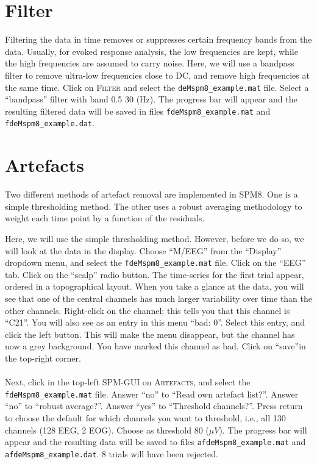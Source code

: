 \section{Filter}
Filtering the data in time removes or suppresses certain frequency bands from the data. Usually, for evoked response analysis, the low frequencies are kept, while the high frequencies are assumed to carry noise. Here, we will use a bandpass filter to remove ultra-low frequencies close to DC, and remove high frequencies at the same time. Click on \textsc{Filter} and select the \texttt{deMspm8\_example.mat} file. Select a ``bandpass'' filter with band 0.5 30 (Hz). The progress bar will appear and the resulting filtered data will be saved in files \texttt{fdeMspm8\_example.mat} and \texttt{fdeMspm8\_example.dat}.

\section{Artefacts}
Two different methods of artefact removal are implemented in SPM8. One is a simple thresholding method. The other uses a robust averaging methodology to weight each time point by a function of the residuals.

Here, we will use the simple thresholding method. However, before we do so, we will look at the data in the display. Choose ``M/EEG'' from the ``Display'' dropdown menu, and select the \texttt{fdeMspm8\_example.mat} file. Click on the ``EEG'' tab. Click on the ``scalp'' radio button. The time-series for the first trial appear, ordered in a topographical layout. When you take a glance at the data, you will see that one of the central channels has much larger variability over time than the other channels. Right-click on the channel; this tells you that this channel is ``C21''. You will also see as an entry in this menu ``bad: 0''. Select this entry, and click the left button. This will make the menu disappear, but the channel has now a grey background. You have marked this channel as bad. Click on ``save''in the top-right corner.
\\
\\
Next, click in the top-left SPM-GUI on \textsc{Artefacts}, and select the \texttt{fdeMspm8\_example.mat} file. Answer ``no'' to ``Read own artefact list?''. Answer ``no'' to ``robust average?''. Answer ``yes'' to ``Threshold channels?''. Press return to choose the default for which channels you want to threshold, i.e., all 130 channels (128 EEG, 2 EOG). Choose as threshold 80 ($\mu V$). The progress bar will appear and the resulting data will be saved to files \texttt{afdeMspm8\_example.mat} and \texttt{afdeMspm8\_example.dat}. 8 trials will have been rejected.

